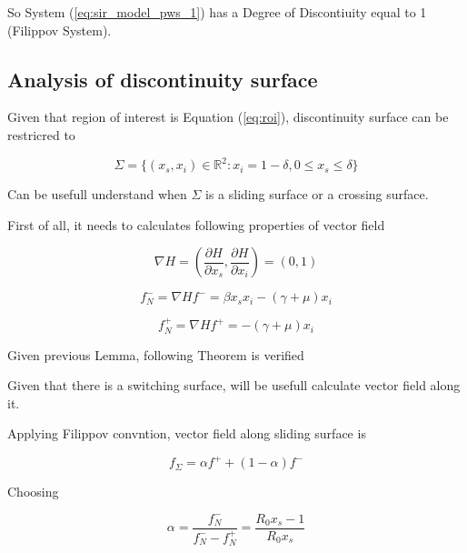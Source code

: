 So System (\ref{eq:sir_model_pws_1}) has a Degree of Discontiuity equal to 1 (Filippov System).

\subsection{Analysis of discontinuity surface}
Given that region of interest is Equation (\ref{eq:roi}), discontinuity surface can be restricred to

\begin{equation}
    \label{eq:switching_manifold}
    \Sigma = \{ (x_s,x_i) \in \mathbb{R}^2 : x_i = 1-\delta, 0 \leq x_s \leq \delta \}
\end{equation}

Can be usefull understand when $\Sigma$ is a sliding surface or a crossing surface.

First of all, it needs to calculates following properties of vector field

\begin{equation}
    \nabla H = \left(\frac{\partial H}{\partial x_s}, \frac{\partial H}{\partial x_i}\right) = (0,1)
\end{equation}

\begin{equation}
    \label{eq:f-}
    f^-_N = \nabla H f^- = \beta x_sx_i-(\gamma + \mu)x_i
\end{equation}

\begin{equation}
    \label{eq:f+}
    f^+_N = \nabla H f^+ = -(\gamma + \mu)x_i
\end{equation}





Given previous Lemma, following Theorem is verified



Given that there is a switching surface, will be usefull calculate vector field along it.

Applying Filippov convntion, vector field along sliding surface is

\begin{equation}
    \label{eq:switching_surface_vector_field_1}
    f_\Sigma = \alpha f^+ + (1-\alpha)f^-
\end{equation}

Choosing

\begin{equation}
    \label{eq:switching_surface_alpha}
    \alpha = \frac{f^-_N}{f^-_N-f^+_N} = \frac{R_0x_s-1}{R_0x_s}
\end{equation}

